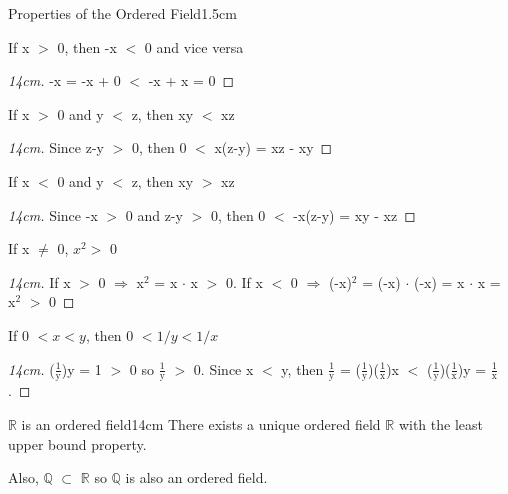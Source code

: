 	\vspace{0.4cm}



	\begin{ltheorem}{Properties of the Ordered Field}{1.5cm}
		\item If x $>$ 0, then -x $<$ 0 and vice versa
	
			\begin{proof}[14cm]
				-x = -x + 0 $<$ -x + x = 0
			\end{proof}

		\item If x $>$ 0 and y $<$ z, then xy $<$ xz
	
			\begin{proof}[14cm]
				Since z-y $>$ 0, then 0 $<$ x(z-y) = xz - xy
			\end{proof}

		\item If x $ < $ 0 and y $ < $ z, then xy $ > $ xz

			\begin{proof}[14cm]
				Since -x $>$ 0 and z-y $>$ 0, then 0 $<$ -x(z-y) = xy - xz
			\end{proof}
	
		\item If x $\neq$ 0, $x^2 > $ 0

			\begin{proof}[14cm]
				If x $>$ 0 $\Rightarrow$ x$^\text{2}$ = x $\cdot$ x $>$ 0.
				If x $<$ 0 $\Rightarrow$ (-x)$^\text{2}$ = (-x) $\cdot$ (-x)
				= x $\cdot$ x = x$^\text{2}$ $>$ 0
			\end{proof}
	
		\item If 0 $< x < y$, then 0 $< 1/y < 1/x$

			\begin{proof}[14cm]
				($\frac{1}{\text{y}}$)y = 1 $>$ 0 so
				$\frac{1}{\text{y}}$ $>$ 0.				
				Since x $<$ y, then $\frac{1}{\text{y}}$
				= ($\frac{1}{\text{y}}$)($\frac{1}{\text{x}}$)x
				$<$ ($\frac{1}{\text{y}}$)($\frac{1}{\text{x}}$)y
				= $\frac{1}{\text{x}}$.
			\end{proof}
	\end{ltheorem}

	\newpage



	\begin{wtheorem}{$\mathbb{R}$ is an ordered field}{14cm}
		There exists a unique ordered field $\mathbb{R}$ with the
		least upper bound property.

		Also, $\mathbb{Q}$  $\subset$ $\mathbb{R}$ so $\mathbb{Q}$ is
		also an ordered field.
	\end{wtheorem}

